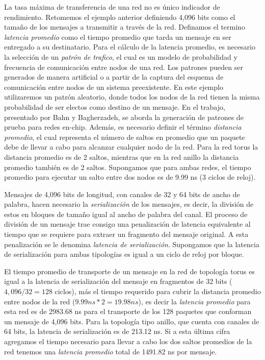 La tasa máxima de transferencia de una red no es único indicador de rendimiento. Retomemos el ejemplo anterior definiendo 4,096 bits como el tamaño de los mensajes a transmitir a través de la red. Definamos el termino \textit{latencia promedio} como el tiempo promedio que tarda un mensaje en ser entregado a su destinatario. Para el cálculo de la latencia promedio, es necesario la selección de un \textit{patrón de trafico}, el cual es un modelo de probabilidad y frecuencia de comunicación entre nodos de una red. Los patrones pueden ser generados de manera artificial o a partir de la captura del esquema de comunicación entre nodos de un sistema preexistente. En este ejemplo utilizaremos un patrón aleatorio, donde todos los nodos de la red tienen la misma probabilidad de ser electos como destino de un mensaje. En el trabajo\cite{chapter1:Bahn09ageneric}, presentado por Bahn y Bagherzadeh, se aborda la generación de patrones de prueba para redes en-chip. Además, es necesario definir el término \textit{distancia promedio}, el cual representa el número de saltos en promedio que un paquete debe de llevar a cabo para alcanzar cualquier nodo de la red. Para la red torus la distancia promedio es de 2 saltos, mientras que en la red anillo la distancia promedio también es de 2 saltos. Supongamos que para ambas redes, el tiempo promedio para ejecutar un salto entre dos nodos es de 9.99 ns (3 ciclos de reloj).

Mensajes de 4,096 bits de longitud, con canales de 32 y 64 bits de ancho de palabra, hacen necesario la \textit{serialización} de los mensajes, es decir, la división de estos en bloques de tamaño igual al ancho de palabra del canal. El proceso de división de un mensaje trae consigo una penalización de latencia equivalente al tiempo que se requiere para extraer un fragmento del mensaje original. A esta penalización se le denomina \textit{latencia de serialización}. Supongamos que la latencia de serialización para ambas tipologías es igual a un ciclo de reloj por bloque.

El tiempo promedio de transporte de un mensaje en la red de topología torus es igual a la latencia de serialización del mensaje en fragmentos de 32 bits ($4,096/32 = 128$ ciclos), más el tiempo requerido para cubrir la distancia promedio entre nodos de la red ($9.99ns * 2 = 19.98ns$), es decir la \textit{latencia promedio} para esta red es de 2983.68 ns para el transporte de los 128 paquetes que conforman un mensaje de 4,096 bits. Para la topología tipo anillo, que cuenta con canales de 64 bits, la latencia de serialización es de 213.12 ns. Si a esta última cifra agregamos el tiempo necesario para llevar a cabo los dos saltos promedios de la red tenemos una \textit{latencia promedio} total de 1491.82 ns por mensaje.

